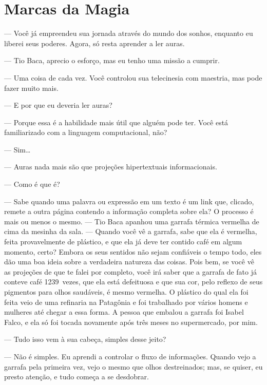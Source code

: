 \chapter{Marcas da Magia}


--- Você já empreendeu sua jornada através do mundo dos sonhos, enquanto
eu liberei seus poderes. Agora, só resta aprender a ler auras.

--- Tio Baca, aprecio o esforço, mas eu tenho uma missão a cumprir.

--- Uma coisa de cada vez. Você controlou sua telecinesia com maestria,
mas pode fazer muito mais.

--- E por que eu deveria ler auras?

--- Porque essa é a habilidade mais útil que alguém pode ter. Você está
familiarizado com a linguagem computacional, não?

--- Sim\ldots

--- Auras nada mais são que projeções hipertextuais informacionais.  

--- Como é que é?

--- Sabe quando uma palavra ou expressão em um texto é um link que,
clicado, remete a outra página contendo a informação completa sobre ela?
O processo é mais ou menos o mesmo. --- Tio Baca apanhou uma garrafa
térmica vermelha de cima da mesinha da sala. --- Quando você vê a
garrafa, sabe que ela é vermelha, feita provavelmente de plástico, e que
ela já deve ter contido café em algum momento, certo? Embora os seus
sentidos não sejam confiáveis o tempo todo, eles dão uma boa ideia sobre
a verdadeira natureza das coisas. Pois bem, se você vê as projeções de
que te falei por completo, você irá saber que a garrafa de fato já
conteve café 1239~vezes, que ela está defeituosa e que sua cor, pelo
reflexo de seus pigmentos para olhos saudáveis, é mesmo vermelha. O
plástico do qual ela foi feita veio de uma refinaria na Patagônia e foi
trabalhado por vários homens e mulheres até chegar a essa forma. A
pessoa que embalou a garrafa foi Isabel Falco, e ela só foi tocada
novamente após três meses no supermercado, por mim.

--- Tudo isso vem à sua cabeça, simples desse jeito?

--- Não é simples. Eu aprendi a controlar o fluxo de informações. Quando
vejo a garrafa pela primeira vez, vejo o mesmo que olhos destreinados;
mas, se quiser, eu presto atenção, e tudo começa a se desdobrar.

